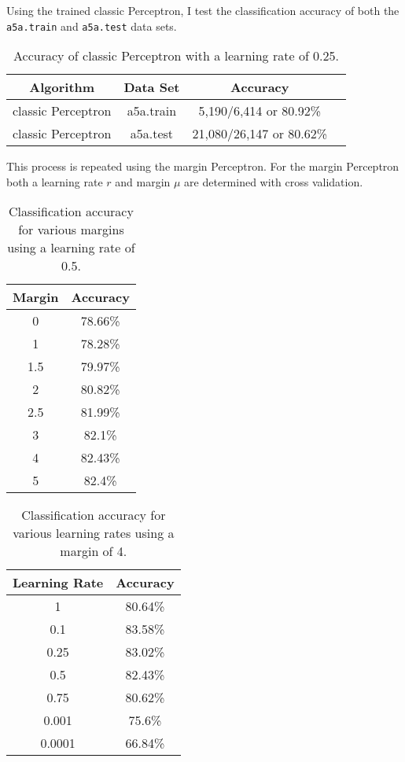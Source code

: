 \documentclass[11pt]{article}
\begin{document}
Using the trained classic Perceptron, I test the classification accuracy of both the \texttt{a5a.train} and \texttt{a5a.test} data sets. 

\begin{table}[H]
\centering
{\renewcommand{\arraystretch}{1.2}%
\begin{tabular}{| c | c | c | c |}
\hline
Algorithm& Data Set &Accuracy\\
\hline
classic Perceptron & a5a.train & 5,190/6,414 or 80.92\%\\ \hline
classic Perceptron & a5a.test & 21,080/26,147 or 80.62\%\\ \hline
\end{tabular}}
\caption{Accuracy of classic Perceptron with a learning rate of 0.25.}
\end{table}

This process is repeated using the margin Perceptron. For the margin Perceptron both a learning rate $r$ and margin $\mu$ are determined with cross validation.

\begin{table}[H]
\centering
{\renewcommand{\arraystretch}{1.2}%
\begin{tabular}{| c | c |}
\hline
Margin & Accuracy\\
\hline
0 & 78.66\%\\ \hline
1 & 78.28\%\\ \hline
1.5 & 79.97\%\\ \hline
2 & 80.82\%\\ \hline
2.5 & 81.99\%\\ \hline
3 & 82.1\%\\ \hline
4 & 82.43\%\\ \hline
5 & 82.4\%\\ \hline
\end{tabular}}
\caption{Classification accuracy for various margins using a learning rate of 0.5.}
\end{table}

\begin{table}[H]
\centering
{\renewcommand{\arraystretch}{1.2}%
\begin{tabular}{| c | c |}
\hline
Learning Rate& Accuracy\\
\hline
1 & 80.64\%\\ \hline
0.1 & 83.58\%\\ \hline
0.25 & 83.02\%\\ \hline
0.5 & 82.43\%\\ \hline
0.75 & 80.62\%\\ \hline
0.001 & 75.6\%\\ \hline
0.0001 & 66.84\%\\ \hline
\end{tabular}}
\caption{Classification accuracy for various learning rates using a margin of 4.}
\end{table}
\end{document}
